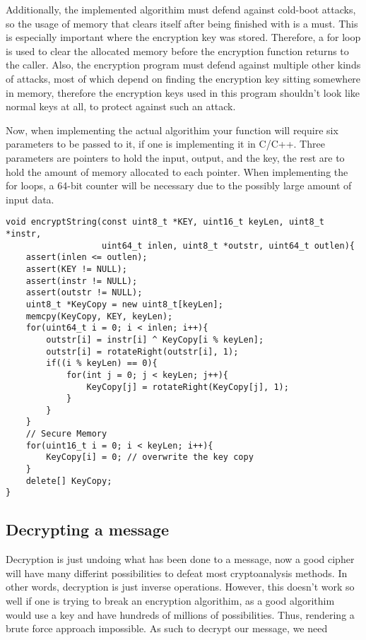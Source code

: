 \documentclass[12pt]{article}
\begin{document}
    Additionally, the implemented algorithim must defend against cold-boot
    attacks, so the usage of memory that clears itself after being finished
    with is a must. This is especially important where the encryption key
    was stored. Therefore, a for loop is used to clear the allocated memory
    before the encryption function returns to the caller. Also, the
    encryption program must defend against multiple other kinds of attacks,
    most of which depend on finding the encryption key sitting somewhere
    in memory, therefore the encryption keys used in this program shouldn't
    look like normal keys at all, to protect against such an attack.
    
    Now, when implementing the actual algorithim your function will require
    six parameters to be passed to it, if one is implementing it in C/C++.
    Three parameters are pointers to hold the input, output, and the key, the
    rest are to hold the amount of memory allocated to each pointer. When
    implementing the for loops, a 64-bit counter will be necessary due to the
    possibly large amount of input data.

    \singlespacing
    \lstset{language=C++,
            basicstyle=\small,
            numbers=left,
            numberstyle=\tiny,
            stepnumber=1}
    \begin{lstlisting}[caption=C++ Encryption Source Code]
void encryptString(const uint8_t *KEY, uint16_t keyLen, uint8_t *instr,
                   uint64_t inlen, uint8_t *outstr, uint64_t outlen){
    assert(inlen <= outlen);
    assert(KEY != NULL);
    assert(instr != NULL);
    assert(outstr != NULL);
    uint8_t *KeyCopy = new uint8_t[keyLen];
    memcpy(KeyCopy, KEY, keyLen);
    for(uint64_t i = 0; i < inlen; i++){
        outstr[i] = instr[i] ^ KeyCopy[i % keyLen];
        outstr[i] = rotateRight(outstr[i], 1);
        if((i % keyLen) == 0){
            for(int j = 0; j < keyLen; j++){
                KeyCopy[j] = rotateRight(KeyCopy[j], 1);
            }
        }
    }
    // Secure Memory
    for(uint16_t i = 0; i < keyLen; i++){
        KeyCopy[i] = 0; // overwrite the key copy
    }
    delete[] KeyCopy;
}
    \end{lstlisting}
\doublespacing
\subsection{Decrypting a message}
    Decryption is just undoing what has been done to a message, now a
    good cipher will have many differint possibilities to defeat most
    cryptoanalysis methods. In other words, decryption is just inverse
    operations. However, this doesn't work so well if one is trying to
    break an encryption algorithim, as  a good algorithim would use a
    key and have hundreds of millions of possibilities. Thus, rendering
    a brute force approach impossible. As such to decrypt our message,
    we need 
\end{document}
